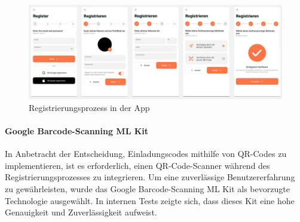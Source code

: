 \begin{figure}[h]
  \centering
  \includegraphics[width=\textwidth]{pics/registration-process.JPG}
  \caption{Registrierungsprozess in der App}
  \label{fig:registration-process}
\end{figure}


\paragraph{Google Barcode-Scanning ML Kit}
In Anbetracht der Entscheidung, Einladungscodes mithilfe von QR-Codes zu implementieren, ist es erforderlich, einen QR-Code-Scanner während des Registrierungsprozesses zu integrieren. Um eine zuverlässige Benutzererfahrung zu gewährleisten, wurde das Google Barcode-Scanning ML Kit als bevorzugte Technologie ausgewählt. In internen Tests zeigte sich, dass dieses Kit eine hohe Genauigkeit und Zuverlässigkeit aufweist.

